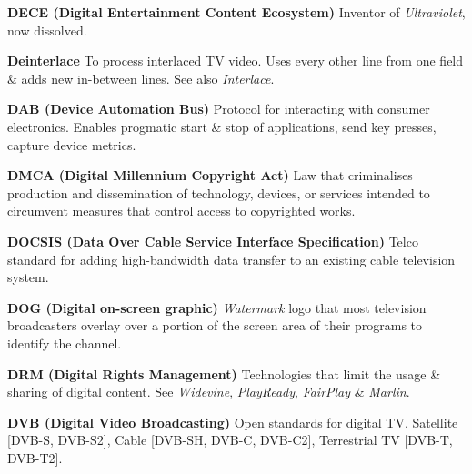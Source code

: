 \smallskip
\textbf{DECE (Digital Entertainment Content Ecosystem)}
Inventor of \textit{Ultraviolet}, now dissolved.

\smallskip
\textbf{Deinterlace}
To process interlaced TV video. Uses every other line from one field \& adds new in-between lines. See also \textit{Interlace}.

\smallskip
\textbf{DAB (Device Automation Bus)}
Protocol for interacting with consumer electronics. Enables progmatic start \& stop of applications, send key presses, capture device metrics.

\smallskip
\textbf{DMCA (Digital Millennium Copyright Act)}
Law that criminalises production and dissemination of technology, devices, or services intended to circumvent measures that control access to copyrighted works.

\smallskip
\textbf{DOCSIS (Data Over Cable Service Interface Specification)}
Telco standard for adding high-bandwidth data transfer to an existing cable television system.

\smallskip
\textbf{DOG (Digital on-screen graphic)}
\textit{Watermark} logo that most television broadcasters overlay over a portion of the screen area of their programs to identify the channel.

\smallskip
\textbf{DRM (Digital Rights Management)}
Technologies that limit the usage \& sharing of digital content.  See \textit{Widevine}, \textit{PlayReady}, \textit{FairPlay} \& \textit{Marlin}.

\smallskip
\textbf{DVB (Digital Video Broadcasting)}
Open standards for digital TV.  Satellite [DVB-S, DVB-S2], Cable [DVB-SH, DVB-C, DVB-C2], Terrestrial TV [DVB-T, DVB-T2].
